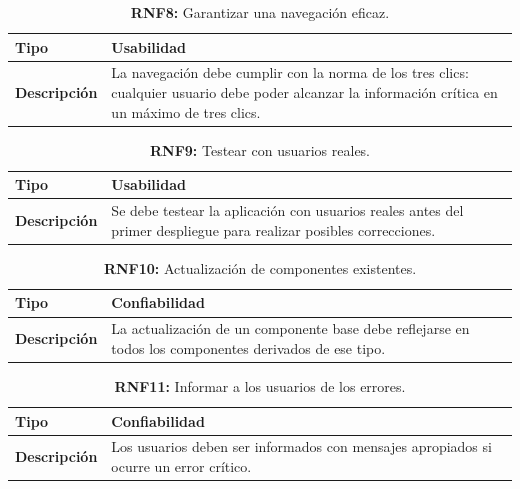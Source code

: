 \documentclass[a4paper, 12pt]{article}
\begin{document}
\begin{table}[H]
\captionsetup{list=no}%
\captionsetup{justification=raggedright,singlelinecheck=false}
\captionsetup{labelformat=empty}
\caption{\textbf{RNF8:} Garantizar una navegación eficaz.}
\label{tab:RNF8}
    \begin{tabular}{|m{5cm}|m{10cm}|}
	    \hline
	    \textbf{Tipo} & Usabilidad \\ 
	    \hline
	    \textbf{Descripción} & La navegación debe cumplir con la norma de los tres clics: cualquier usuario debe poder alcanzar la información crítica en un  máximo de tres clics. \\ 
	    \hline
    \end{tabular}
\end{table}

\begin{table}[H]
\captionsetup{list=no}%
\captionsetup{justification=raggedright,singlelinecheck=false}
\captionsetup{labelformat=empty}
\caption{\textbf{RNF9:} Testear con usuarios reales.}
\label{tab:RNF9}
    \begin{tabular}{|m{5cm}|m{10cm}|}
	    \hline
	    \textbf{Tipo} & Usabilidad \\ 
	    \hline
	    \textbf{Descripción} & Se debe testear la aplicación con usuarios reales antes del primer despliegue para realizar posibles correcciones. \\ 
	    \hline
    \end{tabular}
\end{table}

\begin{table}[H]
\captionsetup{list=no}%
\captionsetup{justification=raggedright,singlelinecheck=false}
\captionsetup{labelformat=empty}
\caption{\textbf{RNF10:} Actualización de componentes existentes.}
\label{tab:RNF10}
    \begin{tabular}{|m{5cm}|m{10cm}|}
	    \hline
	    \textbf{Tipo} & Confiabilidad \\ 
	    \hline
	    \textbf{Descripción} & La actualización de un componente base debe reflejarse en todos los componentes derivados de ese tipo. \\ 
	    \hline
    \end{tabular}
\end{table}

\begin{table}[H]
\captionsetup{list=no}%
\captionsetup{justification=raggedright,singlelinecheck=false}
\captionsetup{labelformat=empty}
\caption{\textbf{RNF11:} Informar a los usuarios de los errores.}
\label{tab:RNF11}
    \begin{tabular}{|m{5cm}|m{10cm}|}
	    \hline
	    \textbf{Tipo} & Confiabilidad \\ 
	    \hline
	    \textbf{Descripción} & Los usuarios deben ser informados con mensajes apropiados si ocurre un error crítico. \\ 
	    \hline
    \end{tabular}
\end{table}
\end{document}
